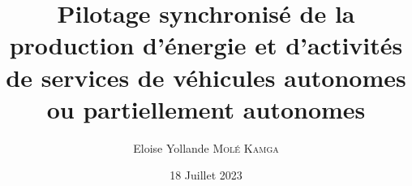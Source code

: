 \documentclass[11pt,a4paper]{report}
\author{Eloise Yollande \textsc{Molé Kamga}}
\title{Pilotage synchronisé de la production d'énergie et d'activités de services de véhicules autonomes ou partiellement autonomes}
\date{ 18 Juillet 2023}
\newcommand{\poubelle}[1]{}
\begin{document}
\pagedegarde





\poubelle{
	
	\chapter*{Remerciements}
Tout d'abord je voudrais remercier \textbf{Nabil ABSI} et \textbf{Sandra Ulrich NGUEVEU} d'avoir accepté de relire cette thèse et d'en être rapporteurs. La version finale de ce mémoire va bénéficier de leur lecture très attentive et de leurs remarques précieuses. Je tiens à remercier \textbf{PR1} d'avoir accepté d'être président du jury. Je remercie également tous les
membres du jury d'avoir accepté d'assister à la présentation de ce travail, particulièrement \textbf{Pierre FOUILHOUX} et \textbf{Ibrahima DIARRASSOUBA}.

Je remercie chaleureusement toutes les personnes qui m'ont aidé pendant l'élaboration de ma thèse et notamment mes directrices \textbf{Fatiha BENDALI}, \textbf{Hélène TOUSSAINT}, et, mes directeurs \textbf{Jean MAILFERT}, \textbf{Alain QUILLIOT} pour leur intérêt, leur soutien, leur grande disponibilité et leurs nombreux conseils tout au long de mes années de doctorat. Ils ont toujours été à l'écoute de mes nombreuses questions, et
se sont toujours intéressés à l'avancée de mes travaux. Les nombreuses discussions que nous avons
eues ainsi que leurs conseils sont pour beaucoup dans le résultat final de ce travail. Leurs capacités
d'analyse et leur enthousiasme m'ont montré que le monde de la recherche pouvait être un univers
passionnant. Enfin, leurs nombreuses relectures et corrections de cette thèse ont été très appréciables.
Cette thèse leurs doit beaucoup !

Ce travail n'aurait pas été possible sans le soutien de l'Université Clermont Auvergne et du LIMOS, qui m'ont permis, grâce à une allocation de recherches du Labex IMobS3 et du FEDER-Région Auvergne, de me consacrer sereinement à l'élaboration de ma thèse.

}
\end{document}

